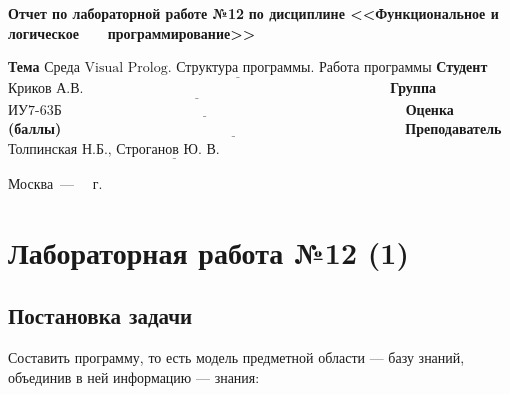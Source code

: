 \documentclass[12pt]{report}
\begin{document}
\begin{titlepage}
		\begin{center}
			\noindent\begin{minipage}{1.1\textwidth}\centering
				\Large\textbf{  Отчет по лабораторной работе №12}\newline
				\textbf{по дисциплине <<Функциональное и логическое}\newline
				\textbf{~~~программирование>>}\newline\newline
			\end{minipage}
		\end{center}
		
		\noindent\textbf{Тема} $\underline{\text{Среда Visual Prolog. Структура программы. Работа программы}}$\newline\newline
		\noindent\textbf{Студент} $\underline{\text{Криков А.В.~~~~~~~~~~~~~~~~~~~~~~~~~~~~~~~~~~~~~~~~~~~~~~~~~~~~~~~~~~~~~~~~~}}$\newline\newline
		\noindent\textbf{Группа} $\underline{\text{ИУ7-63Б~~~~~~~~~~~~~~~~~~~~~~~~~~~~~~~~~~~~~~~~~~~~~~~~~~~~~~~~~~~~~~~~~~~~~~~~~}}$\newline\newline
		\noindent\textbf{Оценка (баллы)} $\underline{\text{~~~~~~~~~~~~~~~~~~~~~~~~~~~~~~~~~~~~~~~~~~~~~~~~~~~~~~~~~~~~~~~~~~~~~~~~}}$\newline\newline
		\noindent\textbf{Преподаватель} $\underline{\text{Толпинская Н.Б., Строганов Ю. В.~~~~~~~~~~~~~~~~~~~~~~~~~~}}$\newline\newline\newline
		
		\begin{center}
			\vfill
			Москва~---~\the\year
			~г.
		\end{center}
	\end{titlepage}
	

\chapter*{Лабораторная работа №12 (1)}
\section*{Постановка задачи}
Составить программу, то есть модель предметной области — базу знаний, объединив в ней информацию — знания:
\end{document}
